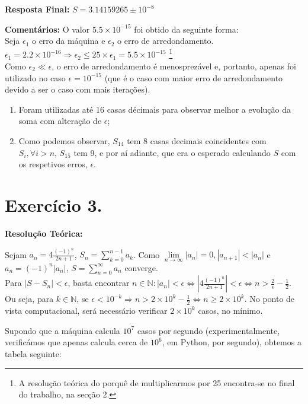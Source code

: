 \documentclass{article}
\begin{document}
\begin{center}
  \textbf{Resposta Final:} $S = 3.14159265 \pm 10^{-8}$
\end{center}
\textbf{Comentários:} O valor $5.5\times10^{-15}$ foi obtido da seguinte forma:\\
Seja $\epsilon_{1}$ o erro da máquina e $\epsilon_2$ o erro de arredondamento.
$\epsilon_{1}=2.2\times 10^{-16} \Rightarrow \epsilon_2 \leq 25 \times \epsilon_{1} = 5.5\times 10^{-15}$ \footnote{A resolução teórica do porquê de multiplicarmos por 25 encontra-se no final do trabalho, na secção 2.}\\[2mm]
Como $\epsilon_2 \ll \epsilon$, o erro de arredondamento é menosprezável e, portanto, apenas foi utilizado no caso $\epsilon = 10^{-15}$ (que é o caso com maior erro de arredondamento devido a ser o caso com mais iterações).\begin{enumerate}
  \item{Foram utilizadas até 16 casas décimais para observar melhor a evolução da soma com alteração de $\epsilon$;}
  \item{Como podemos observar, $S_{14}$ tem 8 casas decimais coincidentes com $S_i, \forall i>n$, $S_{15}$ tem 9, e por aí adiante, que era o esperado calculando $S$ com os respetivos erros, $\epsilon$.}
\end{enumerate}
\newpage
\section*{Exercício 3.}
\textbf{Resolução Teórica:}
\begin{center}
Sejam $a_n=4\frac{(-1)^n}{2n+1}$, $S_n=\sum\limits_{k=0}^{n-1}a_k$. Como $\lim\limits_{n\to\infty}{|a_n|}=0,|a_{n+1}|<|a_n|$ e $a_n={(-1)}^n|a_n|$, $S=\sum\limits_{n=0}^{\infty}a_n$ converge.\\[1mm]
Para $|S-S_n|<\epsilon$, basta encontrar $n\in\mathbb{N}:|a_n|<\epsilon \Leftrightarrow|4\frac{(-1)^n}{2n+1}|<\epsilon\Leftrightarrow n>\frac{2}{\epsilon}-\frac{1}{2}$.\\[1mm]
Ou seja, para $k\in\mathbb{N}$, se $\epsilon<10^{-k} \Rightarrow n>2\times10^{k}-\frac{1}{2}\Leftrightarrow n\geq 2\times10^k$. No ponto de vista computacional, será necessário verificar $2\times10^k$ casos, no mínimo.
\end{center}
Supondo que a máquina calcula $10^7$ casos por segundo (experimentalmente, verificámos que apenas calcula  cerca de $10^6$, em Python, por segundo), obtemos a tabela seguinte:
\end{document}
